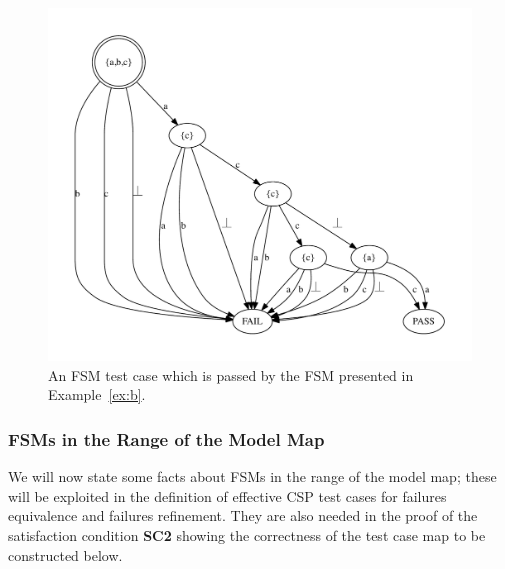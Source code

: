  \begin{figure}
 \begin{center}
\includegraphics[width=.8\textwidth]{fsm0tc.pdf}
\end{center}
\caption{An FSM test case which is passed by the FSM presented in Example~\ref{ex:b}.}
 \label{fig:fsm0tc}
 \end{figure}


\subsubsection{FSMs in the Range of the Model Map}
\label{sec:fsmT}

We will now state some facts about FSMs in the range of the model map; these will be exploited in the definition of effective CSP test cases for failures equivalence and
failures refinement. They are also needed in the proof of the satisfaction condition
{\bf SC2} showing the correctness of the test case map to be constructed below.


